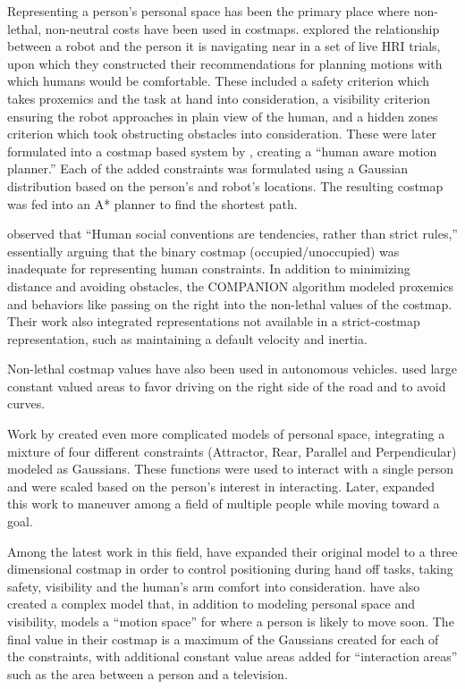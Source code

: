 Representing a person's personal space has been the primary place where non-lethal, non-neutral costs have been used in costmaps. \citet{dautenhahn:serveseated} %
explored the relationship between a robot and the person it is navigating near in a set of live HRI trials, upon which they constructed their recommendations for planning motions with which humans would be comfortable. These included a safety criterion which takes proxemics and the task at hand into consideration, a visibility criterion ensuring the robot approaches in plain view of the human, and a hidden zones criterion which took obstructing obstacles into consideration. These were later formulated into a costmap based system by \citet{sisbot2007}, creating a ``human aware motion planner.'' Each of the added constraints was formulated using a Gaussian distribution based on the person's and robot's locations. The resulting costmap was fed into an A* planner to find the shortest path. 

\citet{kirby:companion} observed that ``Human social conventions are tendencies, rather than strict rules,'' essentially arguing that the binary costmap (occupied/unoccupied) was inadequate for representing human constraints. In addition to minimizing distance and avoiding obstacles, the COMPANION algorithm modeled proxemics and behaviors like passing on the right into the non-lethal values of the costmap. Their work also integrated representations not available in a strict-costmap representation, such as maintaining a default velocity and inertia. 

Non-lethal costmap values have also been used in autonomous vehicles. \citet{likhachev:costmaps} used large constant valued areas to favor driving on the right side of the road and to avoid curves. 

Work by \citet{svenstrup2009} created even more complicated models of personal space, integrating a mixture of four different constraints (Attractor, Rear, Parallel and Perpendicular) modeled as Gaussians. These functions were used to interact with a single person and were scaled based on the person's interest in interacting. Later, \citet{svenstrup2010} expanded this work to maneuver among a field of multiple people while moving toward a goal. 

Among the latest work in this field, \citet{sisbot2011} have expanded their original model to a three dimensional costmap in order to control positioning during hand off tasks, taking safety, visibility and the human's arm comfort into consideration. \citet{fraichard:anthronav} have also created a complex model that, in addition to modeling personal space and visibility, models a ``motion space'' for where a person is likely to move soon. The final value in their costmap is a maximum of the Gaussians created for each of the constraints, with additional constant value areas added for ``interaction areas'' such as the area between a person and a television. 

